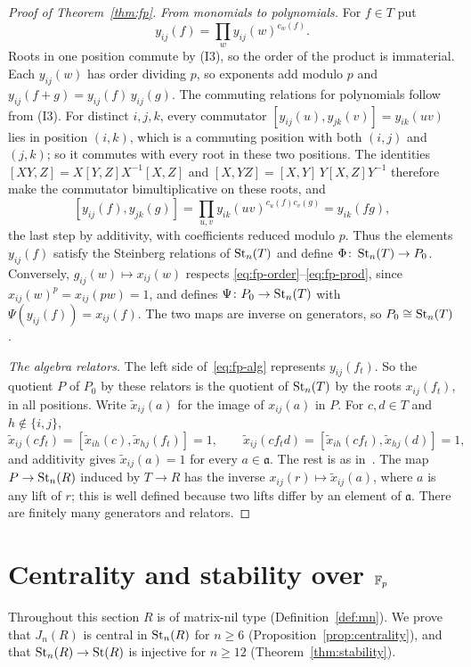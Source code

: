 \begin{proof}[Proof of Theorem~\ref{thm:fp}]
\emph{From monomials to polynomials.} For $f\in T$ put
\[
 y_{ij}(f)=\prod_w y_{ij}(w)^{c_w(f)}.
\]
Roots in one position commute by (I3), so the order of the product is immaterial. Each $y_{ij}(w)$ has order dividing
$p$, so exponents add modulo $p$ and $y_{ij}(f+g)=y_{ij}(f)\,y_{ij}(g)$. The commuting relations for polynomials
follow from (I3). For distinct $i,j,k$, every commutator $[y_{ij}(u),y_{jk}(v)]=y_{ik}(uv)$ lies in position $(i,k)$,
which is a commuting position with both $(i,j)$ and $(j,k)$; so it commutes with every root in these two positions.
The identities $[XY,Z]=X[Y,Z]X^{-1}[X,Z]$ and $[X,YZ]=[X,Y]\,Y[X,Z]Y^{-1}$ therefore make the commutator
bimultiplicative on these roots, and
\[
 [y_{ij}(f),y_{jk}(g)]=\prod_{u,v}y_{ik}(uv)^{c_u(f)c_v(g)}=y_{ik}(fg),
\]
the last step by additivity, with coefficients reduced modulo $p$. Thus the elements $y_{ij}(f)$ satisfy the Steinberg
relations of $\operatorname{St}_n(T)$ and define $\Phi\colon\operatorname{St}_n(T)\to P_0$. Conversely, $g_{ij}(w)\mapsto x_{ij}(w)$ respects
\eqref{eq:fp-order}--\eqref{eq:fp-prod}, since $x_{ij}(w)^p=x_{ij}(pw)=1$, and defines $\Psi\colon P_0\to\operatorname{St}_n(T)$ with
$\Psi(y_{ij}(f))=x_{ij}(f)$. The two maps are inverse on generators, so $P_0\cong\operatorname{St}_n(T)$.

\emph{The algebra relators.} The left side of~\eqref{eq:fp-alg} represents $y_{ij}(f_t)$. So the quotient $P$ of $P_0$
by these relators is the quotient of $\operatorname{St}_n(T)$ by the roots $x_{ij}(f_t)$, in all positions. Write $\tilde x_{ij}(a)$
for the image of $x_{ij}(a)$ in $P$. For $c,d\in T$ and $h\notin\{i,j\}$,
\[
 \tilde x_{ij}(cf_t)=[\tilde x_{ih}(c),\tilde x_{hj}(f_t)]=1,\qquad
 \tilde x_{ij}(cf_td)=[\tilde x_{ih}(cf_t),\tilde x_{hj}(d)]=1,
\]
and additivity gives $\tilde x_{ij}(a)=1$ for every $a\in\mathfrak a$. The rest is as
in~\cite[proof of Theorem~4.1]{OAI247periodic}. The map $P\to\operatorname{St}_n(R)$ induced by $T\to R$ has the inverse
$x_{ij}(r)\mapsto\tilde x_{ij}(a)$, where $a$ is any lift of $r$; this is well defined because two lifts differ by an
element of $\mathfrak a$. There are finitely many generators and relators.
\end{proof}

\section{Centrality and stability over \texorpdfstring{$\mathbb F_p$}{F\_p}}\label{sec:stability}

Throughout this section $R$ is of matrix-nil type (Definition~\ref{def:mn}). We prove that $J_n(R)$ is central in
$\operatorname{St}_n(R)$ for $n\geq6$ (Proposition~\ref{prop:centrality}), and that $\operatorname{St}_n(R)\to\operatorname{St}(R)$ is injective for $n\geq12$
(Theorem~\ref{thm:stability}).

